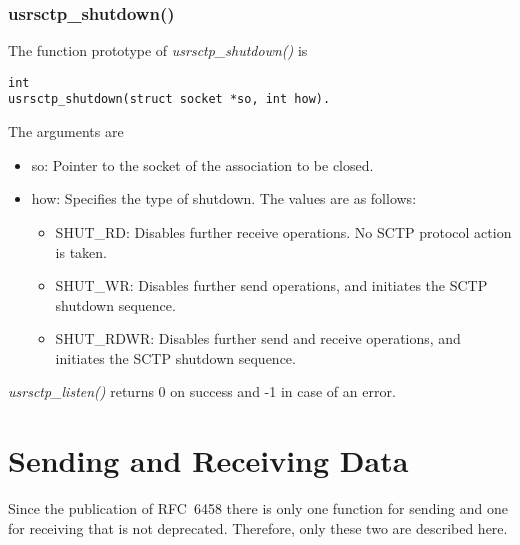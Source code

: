 \documentclass[a4paper]{article}
\begin{document}
\subsubsection{usrsctp\_shutdown()} 
The function prototype of \textit{usrsctp\_shutdown()} is 
\begin{verbatim}   
int
usrsctp_shutdown(struct socket *so, int how).
\end{verbatim}
The arguments are
\begin{itemize}
\item so: Pointer to the socket of the association to be closed.
\item how: Specifies the type of shutdown.  The values are as follows:
\begin{itemize}
\item SHUT\_RD:  Disables further receive operations.  No SCTP protocol
         action is taken.
\item SHUT\_WR:  Disables further send operations, and initiates the SCTP
         shutdown sequence.
\item SHUT\_RDWR:  Disables further send and receive operations, and
         initiates the SCTP shutdown sequence.
\end{itemize}
\end{itemize}
\textit{usrsctp\_listen()} returns 0 on success and -1 in case of an error.

\section{Sending and Receiving Data}
Since the publication of RFC~6458 there is only one function for sending and one for receiving
that is not deprecated. Therefore, only these two are described here.
\end{document}
